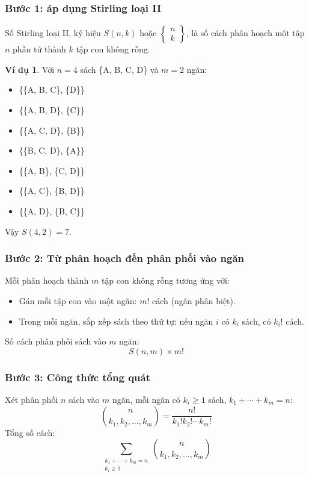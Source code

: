 \documentclass[a4paper,12pt]{article}
\theoremstyle{plain}
\theoremstyle{definition}
\newtheorem{example}{Ví dụ}
\begin{document}
\subsubsection*{Bước 1: áp dụng Stirling loại II}
Số Stirling loại II, ký hiệu \( S(n,k) \) hoặc \( \left\{\begin{matrix} n \\ k \end{matrix}\right\} \), là số cách phân hoạch một tập \( n \) phần tử thành \( k \) tập con không rỗng.

\begin{example}
Với \( n=4 \) sách \{A, B, C, D\} và \( m=2 \) ngăn:
\begin{itemize}
    \item \{\{A, B, C\}, \{D\}\}
    \item \{\{A, B, D\}, \{C\}\}
    \item \{\{A, C, D\}, \{B\}\}
    \item \{\{B, C, D\}, \{A\}\}
    \item \{\{A, B\}, \{C, D\}\}
    \item \{\{A, C\}, \{B, D\}\}
    \item \{\{A, D\}, \{B, C\}\}
\end{itemize}
Vậy \( S(4,2) = 7 \).
\end{example}

\subsubsection*{Bước 2: Từ phân hoạch đến phân phối vào ngăn}
Mỗi phân hoạch thành \( m \) tập con không rỗng tương ứng với:
\begin{itemize}
    \item Gán mỗi tập con vào một ngăn: \( m! \) cách (ngăn phân biệt).
    \item Trong mỗi ngăn, sắp xếp sách theo thứ tự: nếu ngăn \( i \) có \( k_i \) sách, có \( k_i! \) cách.
\end{itemize}

Số cách phân phối sách vào \( m \) ngăn:
\[
S(n,m) \times m!
\]

\subsubsection*{Bước 3: Công thức tổng quát}
Xét phân phối \( n \) sách vào \( m \) ngăn, mỗi ngăn có \( k_i \geq 1 \) sách, \( k_1 + \cdots + k_m = n \):
\[
\binom{n}{k_1,k_2,\ldots,k_m} = \frac{n!}{k_1!k_2!\cdots k_m!}
\]
Tổng số cách:
\[
\sum_{\substack{k_1+\cdots+k_m=n \\ k_i \geq 1}} \binom{n}{k_1,k_2,\ldots,k_m}
\]
\end{document}
